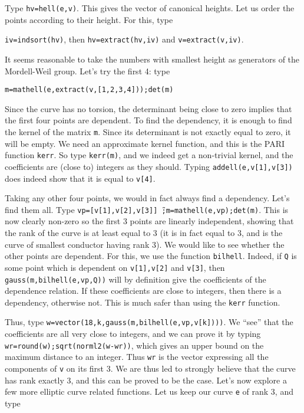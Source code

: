 Type {\tt hv=hell(e,v)}. This gives the vector of canonical heights. Let us 
order the points according to their height. For this, type 

{\tt iv=indsort(hv)}, then {\tt hv=extract(hv,iv)} and {\tt v=extract(v,iv)}.

It seems reasonable to take the numbers with smallest height as generators
of the Mordell-Weil group. Let's try the first 4: type

{\tt m=mathell(e,extract(v,[1,2,3,4]));det(m)}

Since the curve has no torsion, the determinant being close to zero
implies that the first four points are dependent. To find the dependency,
it is enough to find the kernel of the matrix {\tt m}. Since its determinant
is not exactly equal to zero, it will be empty. We need an approximate kernel
function, and this is the PARI function {\tt kerr}. So type {\tt kerr(m)}, 
and we indeed get a non-trivial kernel, and the coefficients are (close to)
integers as they should. Typing {\tt addell(e,v[1],v[3])} does indeed show
that it is equal to {\tt v[4]}.

Taking any other four points, we would in fact always find a dependency. Let's
find them all. Type {\tt vp=[v[1],v[2],v[3]]\~\ ;m=mathell(e,vp);det(m)}. This is
now clearly non-zero so the first 3 points are linearly independent, showing
that the rank of the curve is at least equal to 3 (it is in fact equal to 3,
and is the curve of smallest conductor having rank 3). We would like to see
whether the other points are dependent. For this, we use the function
{\tt bilhell}. Indeed, if {\tt Q} is some point which is dependent on
{\tt v[1],v[2]} and {\tt v[3]}, then {\tt gauss(m,bilhell(e,vp,Q))} will by
definition give the coefficients of the dependence relation. If these 
coefficients are close to integers, then there is a dependency, otherwise not.
This is much safer than using the {\tt kerr} function.

Thus, type {\tt w=vector(18,k,gauss(m,bilhell(e,vp,v[k])))}. We ``see'' that
the coefficients are all very close to integers, and we can prove it by
typing {\tt wr=round(w);sqrt(norml2(w-wr))}, which gives an upper bound
on the maximum distance to an integer. Thus {\tt wr} is the vector expressing
all the components of {\tt v} on its first 3. We are thus led to strongly
believe that the curve has rank exactly 3, and this can be proved to be
the case.
\smallskip
Let's now explore a few more elliptic curve related functions. Let us keep
our curve {\tt e} of rank 3, and type 

